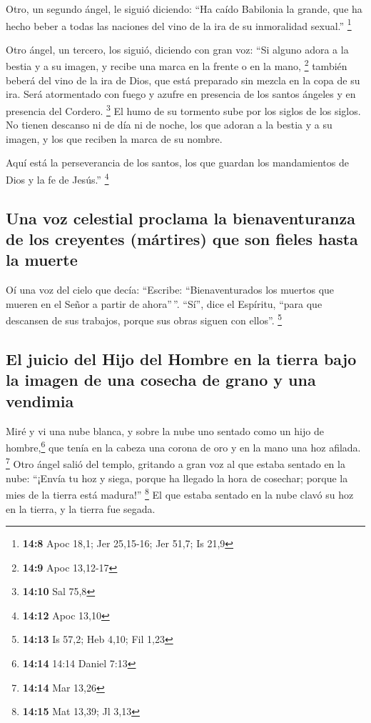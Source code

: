  Otro, un segundo ángel, le siguió diciendo: ``Ha caído
Babilonia la grande, que ha hecho beber a todas las naciones del vino de
la ira de su inmoralidad sexual.'' \footnote{\textbf{14:8} Apoc 18,1;
  Jer 25,15-16; Jer 51,7; Is 21,9}

 Otro ángel, un tercero, los siguió, diciendo con gran
voz: ``Si alguno adora a la bestia y a su imagen, y recibe una marca en
la frente o en la mano, \footnote{\textbf{14:9} Apoc 13,12-17}
 también beberá del vino de la ira de Dios, que está
preparado sin mezcla en la copa de su ira. Será atormentado con fuego y
azufre en presencia de los santos ángeles y en presencia del Cordero.
\footnote{\textbf{14:10} Sal 75,8}  El humo de su
tormento sube por los siglos de los siglos. No tienen descanso ni de día
ni de noche, los que adoran a la bestia y a su imagen, y los que reciben
la marca de su nombre.

 Aquí está la perseverancia de los santos, los que
guardan los mandamientos de Dios y la fe de Jesús.'' \footnote{\textbf{14:12}
  Apoc 13,10}

\hypertarget{una-voz-celestial-proclama-la-bienaventuranza-de-los-creyentes-muxe1rtires-que-son-fieles-hasta-la-muerte}{%
\subsection{Una voz celestial proclama la bienaventuranza de los
creyentes (mártires) que son fieles hasta la
muerte}\label{una-voz-celestial-proclama-la-bienaventuranza-de-los-creyentes-muxe1rtires-que-son-fieles-hasta-la-muerte}}

 Oí una voz del cielo que decía: ``Escribe:
``Bienaventurados los muertos que mueren en el Señor a partir de
ahora''\,''. ``Sí'', dice el Espíritu, ``para que descansen de sus
trabajos, porque sus obras siguen con ellos''. \footnote{\textbf{14:13}
  Is 57,2; Heb 4,10; Fil 1,23}

\hypertarget{el-juicio-del-hijo-del-hombre-en-la-tierra-bajo-la-imagen-de-una-cosecha-de-grano-y-una-vendimia}{%
\subsection{El juicio del Hijo del Hombre en la tierra bajo la imagen de
una cosecha de grano y una
vendimia}\label{el-juicio-del-hijo-del-hombre-en-la-tierra-bajo-la-imagen-de-una-cosecha-de-grano-y-una-vendimia}}

 Miré y vi una nube blanca, y sobre la nube uno sentado
como un hijo de hombre,\footnote{\textbf{14:14} 14:14 Daniel 7:13} que
tenía en la cabeza una corona de oro y en la mano una hoz afilada.
\footnote{\textbf{14:14} Mar 13,26}  Otro ángel salió del
templo, gritando a gran voz al que estaba sentado en la nube: ``¡Envía
tu hoz y siega, porque ha llegado la hora de cosechar; porque la mies de
la tierra está madura!'' \footnote{\textbf{14:15} Mat 13,39; Jl 3,13}
 El que estaba sentado en la nube clavó su hoz en la
tierra, y la tierra fue segada.

